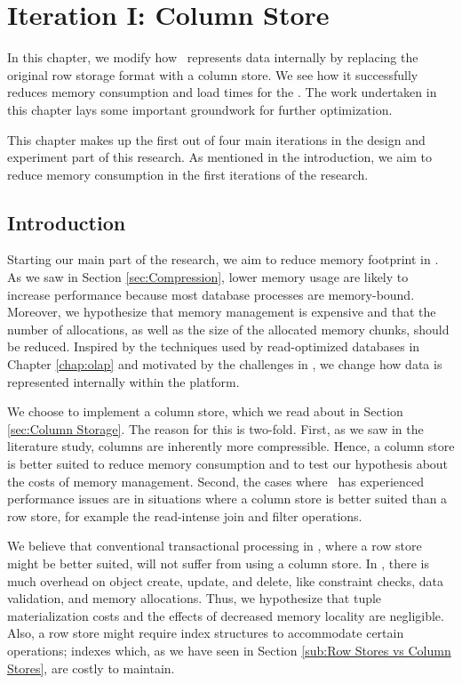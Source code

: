 \chapter{Iteration I: Column Store}
\label{chap:column-store}

In this chapter, we modify how \gap~represents data internally by replacing the original row storage format with a column store. We see how it successfully reduces memory consumption and load times for the \tpchdl. The work undertaken in this chapter lays some important groundwork for further optimization.

This chapter makes up the first out of four main iterations in the design and experiment part of this research. As mentioned in the introduction, we aim to reduce memory consumption in the first iterations of the research. 

\clearpage

\section{Introduction}
\label{sec:Introduction}
Starting our main part of the research, we aim to reduce memory footprint in \gap. As we saw in Section \ref{sec:Compression}, lower memory usage are likely to increase performance because most database processes are memory-bound. Moreover, we hypothesize that memory management is expensive and that the number of allocations, as well as the size of the allocated memory chunks, should be reduced. Inspired by the techniques used by read-optimized databases in Chapter \ref{chap:olap} and motivated by the challenges in \gap, we change how data is represented internally within the platform.

We choose to implement a column store, which we read about in Section \ref{sec:Column Storage}. The reason for this is two-fold. First, as we saw in the literature study, columns are inherently more compressible. Hence, a column store is better suited to reduce memory consumption and to test our hypothesis about the costs of memory management. Second, the cases where \genus~has experienced performance issues are in situations where a column store is better suited than a row store, for example the read-intense join and filter operations.

We believe that conventional transactional processing in \gap, where a row store might be better suited, will not suffer from using a column store. In \gap, there is much overhead on object create, update, and delete, like constraint checks, data validation, and memory allocations. Thus, we hypothesize that tuple materialization costs and the effects of decreased memory locality are negligible. Also, a row store might require index structures to accommodate certain operations; indexes which, as we have seen in Section \ref{sub:Row Stores vs Column Stores}, are costly to maintain.

